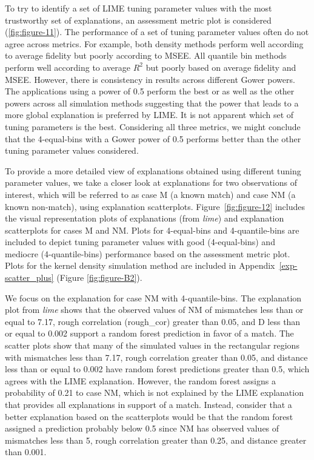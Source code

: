 \documentclass[AMS,STIX2COL]{WileyNJD-v2}\usepackage[]{graphicx}\usepackage[]{color}
\begin{document}
To try to identify a set of LIME tuning parameter values with the most trustworthy set of explanations, an assessment metric plot is considered (\autoref{fig:figure-11}). The performance of a set of tuning parameter values often do not agree across metrics. For example, both density methods perform well according to average fidelity but poorly according to MSEE. All quantile bin methods perform well according to average $R^2$ but poorly based on average fidelity and MSEE. However, there is consistency in results across different Gower powers. The applications using a power of 0.5 perform the best or as well as the other powers across all simulation methods suggesting that the power that leads to a more global explanation is preferred by LIME.  It is not apparent which set of tuning parameters is the best. Considering all three metrics, we might conclude that the 4-equal-bins with a Gower power of 0.5 performs better than the other tuning parameter values considered.

To provide a more detailed view of explanations obtained using different tuning parameter values, we take a closer look at explanations for two observations of interest, which will be referred to as case M (a known match) and case NM (a known non-match), using explanation scatterplots. Figure~\ref{fig:figure-12} includes the visual representation plots of explanations (from \emph{lime}) and explanation scatterplots for cases M and NM. Plots for 4-equal-bins and 4-quantile-bins are included to depict tuning parameter values with good (4-equal-bins) and mediocre (4-quantile-bins) performance based on the assessment metric plot. Plots for the kernel density simulation method are included in Appendix~\ref{exp-scatter_plus} (Figure \ref{fig:figure-B2}). 

We focus on the explanation for case NM with 4-quantile-bins. The explanation plot from \emph{lime} shows that the observed values of NM of mismatches less than or equal to 7.17, rough correlation (rough\_cor) greater than 0.05, and D less than or equal to 0.002 support a random forest prediction in favor of a match. The scatter plots show that many of the simulated values in the rectangular regions with mismatches less than 7.17, rough correlation greater than 0.05, and distance less than or equal to 0.002 have random forest predictions greater than 0.5, which agrees with the LIME explanation. However, the random forest assigns a probability of 0.21 to case NM, which is not explained by the LIME explanation that provides all explanations in support of a match. Instead, consider that a better explanation based on the scatterplots would be that the random forest assigned a prediction probably below 0.5 since NM has observed values of mismatches less than 5, rough correlation greater than 0.25, and distance greater than 0.001.
\end{document}
